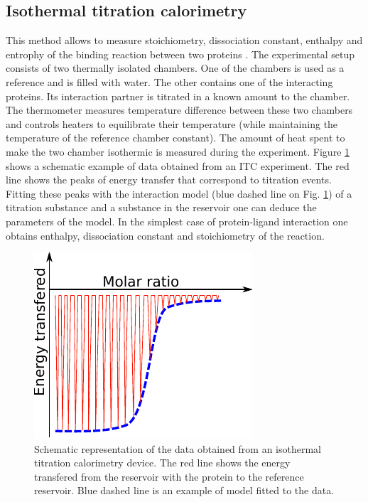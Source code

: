 \subsection{Isothermal titration calorimetry}
This method allows to measure stoichiometry, dissociation constant, enthalpy and entrophy of the binding reaction between two proteins \cite{velazquez2005itc}. 
The experimental setup consists of two thermally isolated chambers.
One of the chambers is used as a reference and is filled with water. The other contains one of the interacting proteins. Its interaction partner is titrated in a known amount to the chamber. 
The thermometer measures temperature difference between these
two chambers and controls heaters to equilibrate their temperature (while maintaining the temperature of the reference chamber constant). 
The amount of heat spent to make the two chamber isothermic is measured during the experiment. 
Figure \ref{Fig:ITC} shows a schematic example of data obtained from an ITC experiment. The red line shows the peaks of energy transfer that correspond to titration events. Fitting 
these peaks with the interaction model (blue dashed line on Fig. \ref{Fig:ITC}) of a titration substance and a substance in the reservoir one can deduce the parameters of the model. 
In the simplest case of protein-ligand interaction one obtains enthalpy, dissociation constant and stoichiometry of the reaction.

\begin{figure}[H]
    \begin{centering}
      \includegraphics[width=0.5\linewidth]{Intro/Fig/ITC.pdf}  
      \caption[Isothermal titration calorimetry explanation]{Schematic representation of the data obtained from an isothermal titration calorimetry device. The red line 
      shows the energy transfered from the reservoir with the protein to the reference reservoir. Blue dashed line is an example of model fitted to the data.}
      \label{Fig:ITC}
    \end{centering}
\end{figure}

